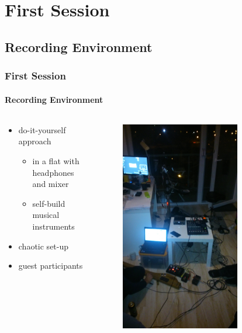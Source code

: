 \documentclass[mathserif,serif]{beamer}
\begin{document}
\section{First Session}
\subsection{Recording Environment}
\begin{frame}
\frametitle{First Session}
\framesubtitle{Recording Environment}

\begin{columns}
    \begin{column}{0.48\textwidth}
        \begin{itemize}
        \item do-it-yourself approach
        \begin{itemize}
        \item in a flat with headphones and mixer
        \item self-build musical instruments        
        \end{itemize}
        \item chaotic set-up
        \item guest participants
        \end{itemize}      
    \end{column}
    \begin{column}{0.48\textwidth}
       \begin{figure}[h!]
       \centering
       \includegraphics[width=0.75\textwidth]{DSC_0402.jpg}

\end{figure}
\end{column}
\end{columns}
\end{frame}
\end{document}
